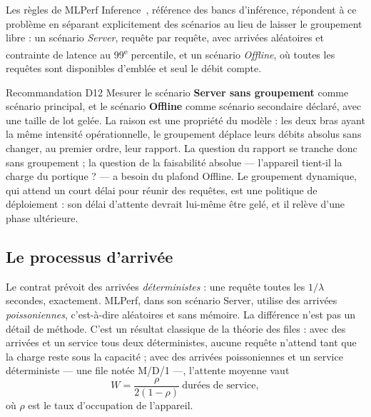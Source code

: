 \documentclass[11pt,a4paper]{article}
\begin{document}
Les règles de MLPerf Inference~\cite{mlperf}, référence des bancs d'inférence,
répondent à ce problème en séparant explicitement des scénarios au lieu de laisser le
groupement libre : un scénario \emph{Server}, requête par requête, avec arrivées
aléatoires et contrainte de latence au 99\textsuperscript{e} percentile, et un
scénario \emph{Offline}, où toutes les requêtes sont disponibles d'emblée et seul le
débit compte.

\begin{encadre}{Recommandation D12}
Mesurer le scénario \textbf{Server sans groupement} comme scénario principal, et le
scénario \textbf{Offline} comme scénario secondaire déclaré, avec une taille de lot
gelée. La raison est une propriété du modèle : les deux bras ayant la même intensité
opérationnelle, le groupement déplace leurs débits absolus sans changer, au premier
ordre, leur rapport. La question du rapport se tranche donc sans groupement ; la
question de la faisabilité absolue — l'appareil tient-il la charge du portique ? — a
besoin du plafond Offline. Le groupement dynamique, qui attend un court délai pour
réunir des requêtes, est une politique de déploiement : son délai d'attente devrait
lui-même être gelé, et il relève d'une phase ultérieure.
\end{encadre}

\subsection{Le processus d'arrivée}

Le contrat prévoit des arrivées \emph{déterministes} : une requête toutes les
$1/\lambda$ secondes, exactement. MLPerf, dans son scénario Server, utilise des
arrivées \emph{poissoniennes}, c'est-à-dire aléatoires et sans mémoire. La différence
n'est pas un détail de méthode. C'est un résultat classique de la théorie des files :
avec des arrivées et un service tous deux déterministes, aucune requête n'attend tant
que la charge reste sous la capacité ; avec des arrivées poissoniennes et un service
déterministe — une file notée M/D/1 —, l'attente moyenne vaut
\[
  W = \frac{\rho}{2(1-\rho)} \ \text{durées de service},
\]
où $\rho$ est le taux d'occupation de l'appareil.
\end{document}
